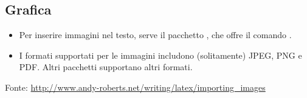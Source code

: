 \documentclass{beamer}
\begin{document}
\subsection{Grafica}
\begin{frame}[fragile]{\insertsubsection}
\begin{itemize}
\item Per inserire immagini nel testo, serve il pacchetto ,
che offre il comando .
\item I formati supportati per le immagini includono (solitamente)
JPEG, PNG e PDF. Altri pacchetti supportano altri formati.
\end{itemize}

\tiny{Fonte: \url{http://www.andy-roberts.net/writing/latex/importing_images}}
\end{frame}
\end{document}
